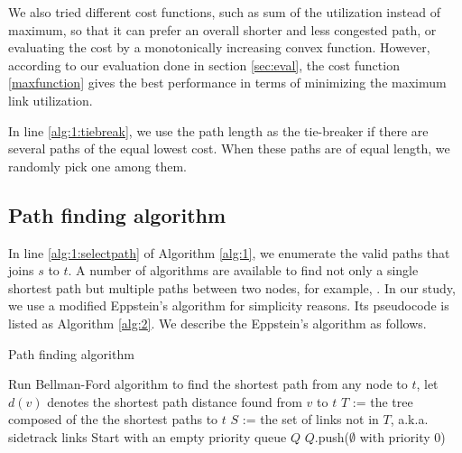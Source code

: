 \documentclass[conference]{IEEEtran}
\begin{document}
We also tried different cost functions, such as sum of the utilization instead
of maximum, so that it can prefer an overall shorter and less congested path,
or evaluating the cost by a monotonically increasing convex function. However,
according to our evaluation done in section \ref{sec:eval}, the cost function
\eqref{maxfunction} gives the best performance in terms of minimizing the
maximum link utilization.

In line \ref{alg:1:tiebreak}, we use the path length as the tie-breaker if
there are several paths of the equal lowest cost. When these paths are of equal
length, we randomly pick one among them.

\subsection{Path finding algorithm}

In line \ref{alg:1:selectpath} of Algorithm \ref{alg:1}, we enumerate the valid
paths that joins $s$ to $t$. A number of algorithms are available to find not
only a single shortest path but multiple paths between two nodes, for example,
\cite{y71,m78}. In our study, we use a modified Eppstein's algorithm \cite{e98}
for simplicity reasons. Its pseudocode is listed as Algorithm \ref{alg:2}. We
describe the Eppstein's algorithm as follows.

\begin{algorithm}
\caption{Path finding algorithm}\label{alg:2}
Run Bellman-Ford algorithm to find the shortest path from any node to $t$,
let $d(v)$ denotes the shortest path distance found from $v$ to $t$\;
$T$ := the tree composed of the the shortest paths to $t$\;
$S$ := the set of links not in $T$, a.k.a. sidetrack links\;
Start with an empty priority queue $Q$\;
$Q$.push($\emptyset$ with priority 0)\;
\end{algorithm}
\end{document}
